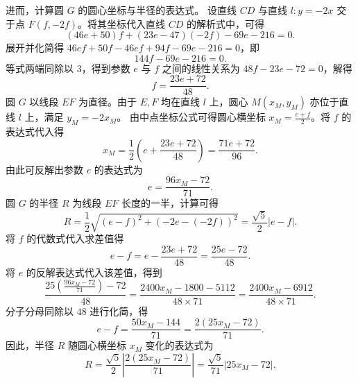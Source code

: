 \begin{solution}
进而，计算圆 $G$ 的圆心坐标与半径的表达式。
设直线 $CD$ 与直线 $l: y = -2x$ 交于点 $F(f, -2f)$。将其坐标代入直线 $CD$ 的解析式中，可得
\[ (46e + 50)f + (23e - 47)(-2f) - 69e - 216 = 0. \]
展开并化简得 $46ef + 50f - 46ef + 94f - 69e - 216 = 0$，即
\[ 144f - 69e - 216 = 0. \]
等式两端同除以 $3$，得到参数 $e$ 与 $f$ 之间的线性关系为 $48f - 23e - 72 = 0$，解得
\[ f = \frac{23e + 72}{48}. \]
圆 $G$ 以线段 $EF$ 为直径。由于 $E, F$ 均在直线 $l$ 上，圆心 $M(x_M, y_M)$ 亦位于直线 $l$ 上，满足 $y_M = -2x_M$。
由中点坐标公式可得圆心横坐标 $x_M = \frac{e+f}{2}$。将 $f$ 的表达式代入得
\[ x_M = \frac{1}{2}\left(e + \frac{23e + 72}{48}\right) = \frac{71e + 72}{96}. \]
由此可反解出参数 $e$ 的表达式为
\[ e = \frac{96x_M - 72}{71}. \]
圆 $G$ 的半径 $R$ 为线段 $EF$ 长度的一半，计算可得
\[ R = \frac{1}{2}\sqrt{(e-f)^2 + (-2e - (-2f))^2} = \frac{\sqrt{5}}{2}|e - f|. \]
将 $f$ 的代数式代入求差值得
\[ e - f = e - \frac{23e + 72}{48} = \frac{25e - 72}{48}. \]
将 $e$ 的反解表达式代入该差值，得到
\[ \frac{25\left(\frac{96x_M - 72}{71}\right) - 72}{48} = \frac{2400x_M - 1800 - 5112}{48 \times 71} = \frac{2400x_M - 6912}{48 \times 71}. \]
分子分母同除以 $48$ 进行化简，得
\[ e - f = \frac{50x_M - 144}{71} = \frac{2(25x_M - 72)}{71}. \]
因此，半径 $R$ 随圆心横坐标 $x_M$ 变化的表达式为
\[ R = \frac{\sqrt{5}}{2} \left| \frac{2(25x_M - 72)}{71} \right| = \frac{\sqrt{5}}{71} |25x_M - 72|. \]


\end{solution}
